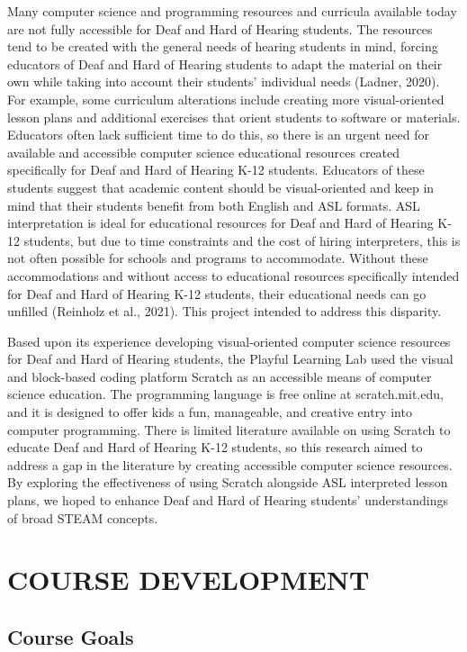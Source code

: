 \documentclass[11.5pt]{sig-alternate} %
\begin{document}
\begin{large}
Many computer science and programming resources and curricula available today are not fully accessible for Deaf and Hard of Hearing students. The resources tend to be created with the general needs of hearing students in mind, forcing educators of Deaf and Hard of Hearing students to adapt the material on their own while taking into account their students’ individual needs (Ladner, 2020). For example, some curriculum alterations include creating more visual-oriented lesson plans and additional exercises that orient students to software or materials. Educators often lack sufficient time to do this, so there is an urgent need for available and accessible computer science educational resources created specifically for Deaf and Hard of Hearing K-12 students. Educators of these students suggest that academic content should be visual-oriented and keep in mind that their students benefit from both English and ASL formats. ASL interpretation is ideal for educational resources for Deaf and Hard of Hearing K-12 students, but due to time constraints and the cost of hiring interpreters, this is not often possible for schools and programs to accommodate. Without these accommodations and without access to educational resources specifically intended for Deaf and Hard of Hearing K-12 students, their educational needs can go unfilled (Reinholz et al., 2021). This project intended to address this disparity.

Based upon its experience developing visual-oriented computer science resources for Deaf and Hard of Hearing students, the Playful Learning Lab used the visual and block-based coding platform Scratch as an accessible means of computer science education. The programming language is free online at scratch.mit.edu, and it is designed to offer kids a fun, manageable, and creative entry into computer programming. There is limited literature available on using Scratch to educate Deaf and Hard of Hearing K-12 students, so this research aimed to address a gap in the literature by creating accessible computer science resources. By exploring the effectiveness of using Scratch alongside ASL interpreted lesson plans, we hoped to enhance Deaf and Hard of Hearing students’ understandings of broad STEAM concepts. 

\section*{COURSE DEVELOPMENT}

\subsection*{Course Goals}


\end{large}
\end{document}
